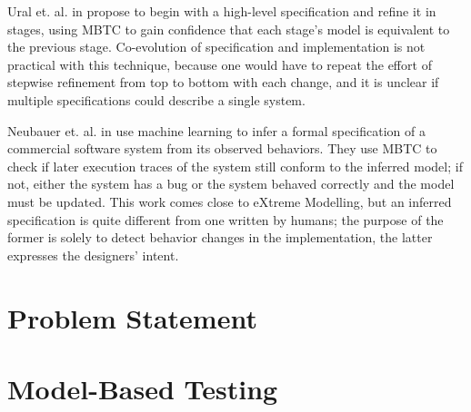 \documentclass{vldb}
\begin{document}
Ural et. al. in \cite{Ural84AutomatedTestingOfProtocolSpecifications} propose to begin with a high-level specification and refine it in stages, using MBTC to gain confidence that each stage's model is equivalent to the previous stage.
Co-evolution of specification and implementation is not practical with this technique, because one would have to repeat the effort of stepwise refinement from top to bottom with each change, and it is unclear if multiple specifications could describe a single system.


Neubauer et. al. in \cite{Neubauer12AutomatedContinuousQualityAssurance} use machine learning to infer a formal specification of a commercial software system from its observed behaviors.
They use MBTC to check if later execution traces of the system still conform to the inferred model; if not, either the system has a bug or the system behaved correctly and the model must be updated.
This work comes close to eXtreme Modelling, but an inferred specification is quite different from one written by humans; the purpose of the former is solely to detect behavior changes in the implementation, the latter expresses the designers' intent.



\section{Problem Statement}
\label{sec:problem_statement}

\section{Model-Based Testing}
\label{sec:model_based_testing}
\end{document}
